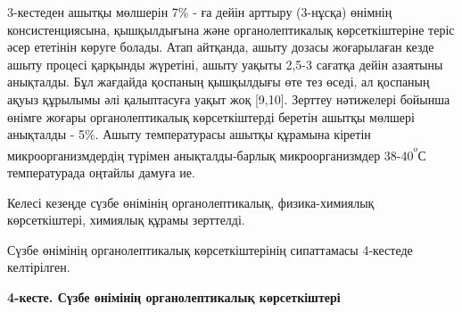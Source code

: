 \begin{multicols}{2}
3-кестеден ашытқы мөлшерін 7\% - ға дейін арттыру (3-нұсқа) өнімнің
консистенциясына, қышқылдығына және органолептикалық көрсеткіштеріне
теріс әсер ететінін көруге болады. Атап айтқанда, ашыту дозасы
жоғарылаған кезде ашыту процесі қарқынды жүретіні, ашыту уақыты 2,5-3
сағатқа дейін азаятыны анықталды. Бұл жағдайда қоспаның қышқылдығы өте
тез өседі, ал қоспаның ақуыз құрылымы әлі қалыптасуға уақыт жоқ
{[}9,10{]}. Зерттеу нәтижелері бойынша өнімге жоғары органолептикалық
көрсеткіштерді беретін ашытқы мөлшері анықталды - 5\%. Ашыту
температурасы ашытқы құрамына кіретін микроорганизмдердің түрімен
анықталды-барлық микроорганизмдер 38-40\textsuperscript{º}С
температурада оңтайлы дамуға ие.

Келесі кезеңде сүзбе өнімінің органолептикалық, физика-химиялық
көрсеткіштері, химиялық құрамы зерттелді.

Сүзбе өнімінің органолептикалық көрсеткіштерінің сипаттамасы 4-кестеде
келтірілген.
\end{multicols}

{\bfseries 4-кесте. Сүзбе өнімінің органолептикалық көрсеткіштері}


